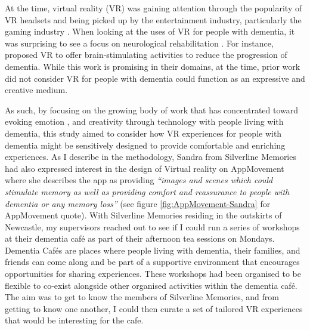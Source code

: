At the time, virtual reality (VR) was gaining attention through the popularity of VR headsets and being picked up by the entertainment industry, particularly the gaming industry \citep{cipriani_understanding_2014}. When looking at the uses of VR for people with dementia, it was surprising to see a focus on neurological rehabilitation \citep{schultheis_application_2001,mendez2015virtual}. For instance, \citep{garcia2012discussion} proposed VR to offer brain-stimulating activities to reduce the progression of dementia. While this work is promising in their domains, at the time, prior work did not consider VR for people with dementia could function as an expressive and creative medium.

As such, by focusing on the growing body of work that has concentrated toward evoking emotion \citep{wallace_design-led_2013}, and creativity through technology with people living with dementia, this study aimed to consider how VR experiences for people with dementia might be sensitively designed to provide comfortable and enriching experiences. As I describe in the methodology, Sandra from Silverline Memories had also expressed interest in the design of Virtual reality on AppMovement where she describes the app as providing \textit{``images and scenes which could stimulate memory as well as providing comfort and reassurance to people with dementia or any memory loss''} (see figure \ref{fig:AppMovement-Sandra} for AppMovement quote). With Silverline Memories residing in the outskirts of Newcastle, my supervisors reached out to see if I could run a series of workshops at their dementia café as part of their afternoon tea sessions on Mondays. Dementia Cafés are places where people living with dementia, their families, and friends can come along and be part of a supportive environment that encourages opportunities for sharing experiences. These workshops had been organised to be flexible to co-exist alongside other organised activities within the dementia café. The aim was to get to know the members of Silverline Memories, and from getting to know one another, I could then curate a set of tailored VR experiences that would be interesting for the cafe.

